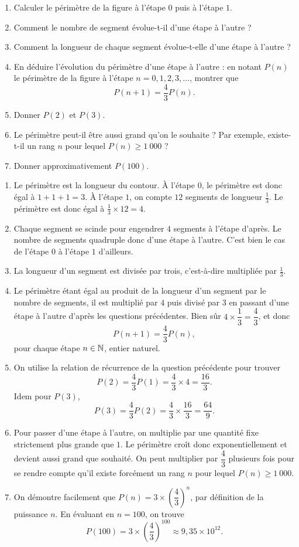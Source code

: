 {	\begin{enumerate}
		\item Calculer le périmètre de la figure à l'étape $0$ puis à l'étape $1$.
		\item Comment le nombre de segment évolue-t-il d'une étape à l'autre ?
		\item Comment la longueur de chaque segment évolue-t-elle d'une étape à l'autre ?
		\item En déduire l'évolution du périmètre d'une étape à l'autre :
		en notant $P(n)$ le périmètre de la figure à l'étape $n=0, 1, 2, 3,\dots$, montrer que
			\[ P(n+1) = \dfrac43 P(n). \]
		\item Donner $P(2)$ et $P(3)$.
		\item Le périmètre peut-il être aussi grand qu'on le souhaite ? Par exemple, existe-t-il un rang $n$ pour lequel $P(n) \geq 1 \ 000$ ?
		\item Donner approximativement $P(100)$.
	\end{enumerate}
}{
	\begin{enumerate}
		\item Le périmètre est la longueur du contour.
		À l'étape $0$, le périmètre est donc égal à $1+1+1 = 3$. 
		À l'étape $1$, on compte $12$ segments de longueur $\frac13$.
		Le périmètre est donc égal à $\frac13 \times 12 = 4$.
		\item Chaque segment se scinde pour engendrer $4$ segments à l'étape d'après.
		Le nombre de segments quadruple donc d'une étape à l'autre. C'est bien le cas de l'étape $0$ à l'étape $1$ d'ailleurs.
		\item La longueur d'un segment est divisée par trois, c'est-à-dire multipliée par $\frac13$.
		\item Le périmètre étant égal au produit de la longueur d'un segment par le nombre de segments, il est multiplié par $4$ puis divisé par $3$ en passant d'une étape à l'autre d'après les questions précédentes.
		Bien sûr $4\times\dfrac13 = \dfrac43$, et donc
			\[ P(n+1) = \dfrac43 P(n), \]
		pour chaque étape $n\in\mathbb{N}$, entier naturel.
		\item On utilise la relation de récurrence de la question précédente pour trouver
			\[ P(2) = \dfrac43 P(1) = \dfrac43 \times 4 = \dfrac{16}3. \]
		Idem pour $P(3)$, 
			\[ P(3) = \dfrac43 P(2) = \dfrac43 \times \dfrac{16}3 = \dfrac{64}9. \]
		\item Pour passer d'une étape à l'autre, on multiplie par une quantité fixe strictement plus grande que $1$.
		Le périmètre croît donc exponentiellement et devient aussi grand que souhaité.
		On peut multiplier par $\dfrac43$ plusieurs fois pour se rendre compte qu'il existe forcément un rang $n$ pour lequel $P(n) \geq 1 \ 000$.
		\item On démontre facilement que $P(n) = 3 \times \left(\dfrac43\right)^n$, par définition de la puissance $n$.
		En évaluant en $n=100$, on trouve
			\[ P(100) = 3 \times \left(\dfrac43\right)^{100} \approx 9,35 \times 10^{12}. \]
	\end{enumerate}

}

